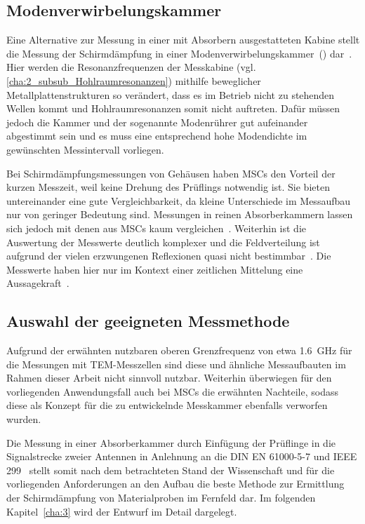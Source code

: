 \subsection{Modenverwirbelungskammer}
Eine Alternative zur Messung in einer mit Absorbern ausgestatteten Kabine stellt die Messung der Schirmdämpfung in einer Modenverwirbelungskammer~() dar~\cite{EMV}. Hier werden die Resonanzfrequenzen der Messkabine (vgl. \Abschnitt\ref{cha:2_subsub_Hohlraumresonanzen}) mithilfe beweglicher Metallplattenstrukturen so verändert, dass es im Betrieb nicht zu stehenden Wellen kommt und Hohlraumresonanzen somit nicht auftreten. Dafür müssen jedoch die Kammer und der sogenannte Modenrührer gut aufeinander abgestimmt sein und es muss eine entsprechend hohe Modendichte im gewünschten Messintervall vorliegen. 
\par
\vspace{\linespace}
Bei Schirmdämpfungsmessungen von Gehäusen haben \acp{MSC} den Vorteil der kurzen Messzeit, weil keine Drehung des Prüflings notwendig ist. Sie bieten untereinander eine gute Vergleichbarkeit, da kleine Unterschiede im Messaufbau nur von geringer Bedeutung sind. Messungen in reinen Absorberkammern lassen sich jedoch mit denen aus \acp{MSC} kaum vergleichen~\cite{EMV}. Weiterhin ist die Auswertung der Messwerte deutlich komplexer und die Feldverteilung ist aufgrund der vielen erzwungenen Reflexionen quasi nicht bestimmbar~\cite{EMV}. Die Messwerte haben hier nur im Kontext einer zeitlichen Mittelung eine Aussagekraft~\cite{EMV}.


\subsection{Auswahl der geeigneten Messmethode}
Aufgrund der erwähnten nutzbaren oberen Grenzfrequenz von etwa \SI{1,6}{\giga\hertz} für die Messungen mit TEM-Messzellen sind diese und ähnliche Messaufbauten im Rahmen dieser Arbeit nicht sinnvoll nutzbar. Weiterhin überwiegen für den vorliegenden Anwendungsfall auch bei \acp{MSC} die erwähnten Nachteile, sodass diese als Konzept für die zu entwickelnde Messkammer ebenfalls verworfen wurden. 
\par
\vspace{\linespace}
Die Messung in einer Absorberkammer durch Einfügung der Prüflinge in die Signalstrecke zweier Antennen in Anlehnung an die DIN EN 61000-5-7 und IEEE 299~\cite{DIN_EN_61000-5-7, IEEE_299} stellt somit nach dem betrachteten Stand der Wissenschaft und für die vorliegenden Anforderungen an den Aufbau die beste Methode zur Ermittlung der Schirmdämpfung von Materialproben im Fernfeld dar. Im folgenden Kapitel~\ref{cha:3} wird der Entwurf im Detail dargelegt.











